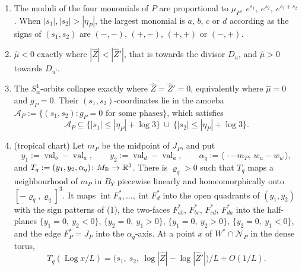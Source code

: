 \begin{lemma}\label{lem:nodemodel}
\begin{enumerate}
\item The moduli of the four monomials of $P$ are proportional to $\mu_P,\ e^{s_1},\ e^{s_2},\ e^{s_1+s_2}$.
When $|s_1|,|s_2|>|\eta_P|$, the largest monomial is $a$, $b$, $c$ or $d$ according as the signs of $(s_1,s_2)$
are $(-,-)$, $(+,-)$, $(+,+)$ or $(-,+)$.
\item $\hat\mu<0$ exactly where $|\hat Z|<|\hat Z'|$, that is towards the divisor $D_u$, and $\hat\mu>0$ towards $D_{u'}$.
\item The $S^1_\alpha$-orbits collapse exactly where $\hat Z=\hat Z'=0$, equivalently where $\hat\mu=0$ and
$g_P=0$. Their $(s_1,s_2)$-coordinates lie in the amoeba
$\mathscr A_P:=\{(s_1,s_2):g_P=0\text{ for some phases}\}$, which satisfies
\[
\mathscr A_P\subseteq\{|s_1|\le|\eta_P|+\log3\}\ \cup\ \{|s_2|\le|\eta_P|+\log3\}.
\]
\item (tropical chart) Let $m_P$ be the midpoint of $J_P$, and put
\[
y_1:=\operatorname{val}_b-\operatorname{val}_a,\qquad y_2:=\operatorname{val}_d-\operatorname{val}_a,\qquad
\alpha_q:=\langle\,\cdot-m_P,\,w_u-w_{u'}\rangle,
\]
and $T_q:=(y_1,y_2,\alpha_q)\colon M_\mathbb R\to\mathbb R^3$. There is $\varrho_q>0$ such that $T_q$ maps a neighbourhood of $m_P$ in
$B_Y$ piecewise linearly and homeomorphically onto $[-\varrho_q,\varrho_q]^3$. It maps
$\operatorname{int}F^*_a,\dots,\operatorname{int}F^*_d$ into the open quadrants of $(y_1,y_2)$ with the sign patterns of
(1), the two-faces $F^*_{ab}$, $F^*_{bc}$, $F^*_{cd}$, $F^*_{da}$ into the half-planes $\{y_1=0,\ y_2<0\}$,
$\{y_2=0,\ y_1>0\}$, $\{y_1=0,\ y_2>0\}$, $\{y_2=0,\ y_1<0\}$, and the edge $F^*_P=J_P$ into the
$\alpha_q$-axis. At a point $x$ of $W^*\cap\mathcal N_P$ in the dense torus,
\[
T_q(\operatorname{Log}x/L)=\bigl(s_1,\ s_2,\ \log|\hat Z|-\log|\hat Z'|\bigr)/L+O(1/L).
\]
\end{enumerate}
\end{lemma}

